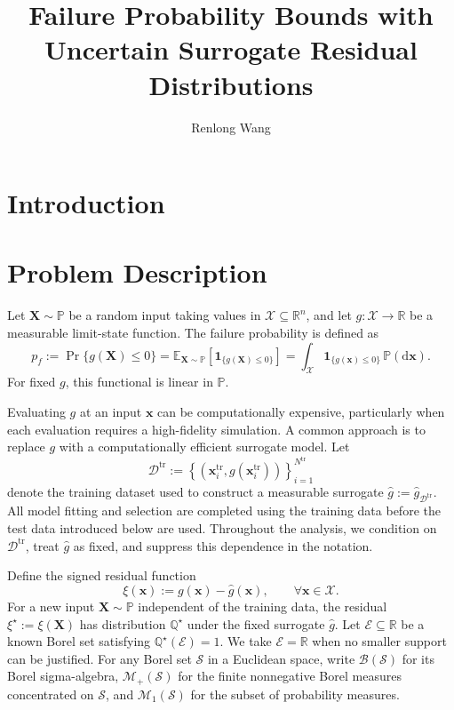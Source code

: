\documentclass[review,11pt,3p,authoryear,nopreprintline]{elsarticle}
\begin{document}
\begin{frontmatter}
  \title{Failure Probability Bounds with Uncertain Surrogate Residual Distributions}

  \author[inst1]{Renlong Wang}

  \begin{abstract}
  \end{abstract}

  \begin{keyword}
  \end{keyword}
\end{frontmatter}

\section{Introduction}

\section{Problem Description}
\label{sec-problem}

Let $\bm X\sim\mathbb P$ be a random input taking values in $\mathcal X\subseteq\mathbb R^n$, and let $g:\mathcal X\to\mathbb R$ be a measurable limit-state function. The failure probability is defined as
\[
  p_f:=\Pr\{g(\bm X)\le0\}=\mathbb E_{\bm X\sim\mathbb P}\left[\mathbf 1_{\{g(\bm X)\le0\}}\right]=\int_{\mathcal X}\mathbf 1_{\{g(\bm x)\le0\}}\,\mathbb P(\mathrm d\bm x).
\]
For fixed $g$, this functional is linear in $\mathbb P$.

Evaluating $g$ at an input $\bm x$ can be computationally expensive, particularly when each evaluation requires a high-fidelity simulation. A common approach is to replace $g$ with a computationally efficient surrogate model. Let
\[
  \mathcal D^{\mathrm{tr}}:=\left\{\left(\bm x_i^{\mathrm{tr}},g(\bm x_i^{\mathrm{tr}})\right)\right\}_{i=1}^{N^{\mathrm{tr}}}
\]
denote the training dataset used to construct a measurable surrogate $\hat g:=\hat g_{\mathcal D^{\mathrm{tr}}}$. All model fitting and selection are completed using the training data before the test data introduced below are used. Throughout the analysis, we condition on $\mathcal D^{\mathrm{tr}}$, treat $\hat g$ as fixed, and suppress this dependence in the notation.

Define the signed residual function
\[
  \xi(\bm x):=g(\bm x)-\hat g(\bm x),\qquad \forall \bm x\in\mathcal X.
\]
For a new input $\bm X\sim\mathbb P$ independent of the training data, the residual $\xi^\star:=\xi(\bm X)$ has distribution $\mathbb Q^\star$ under the fixed surrogate $\hat g$. Let $\mathcal E\subseteq\mathbb R$ be a known Borel set satisfying $\mathbb Q^\star(\mathcal E)=1$. We take $\mathcal E=\mathbb R$ when no smaller support can be justified. For any Borel set $\mathcal S$ in a Euclidean space, write $\mathcal B(\mathcal S)$ for its Borel sigma-algebra, $\mathcal M_+(\mathcal S)$ for the finite nonnegative Borel measures concentrated on $\mathcal S$, and $\mathcal M_1(\mathcal S)$ for the subset of probability measures.
\end{document}
